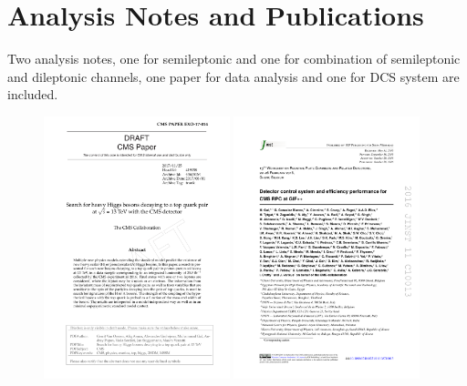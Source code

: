\graphicspath{{chapt_dutch/}{intro/}{chapt2/}{chapt3/}{chapt4/}{chapt5/}{chapt6/}{chapt7/}{publications}}
\renewcommand{\thesection}{\arabic{section}} 
\renewcommand{\bibname}{References}
\renewcommand\evenpagerightmark{{\scshape\small Analysis Notes and Publications}}
\renewcommand\oddpageleftmark{{\scshape\small Analysis Notes and Publications}}
\chapter[Analysis Notes and Publications]%
{Analysis Notes and Publications}\label{an_publications}
Two analysis notes, one for semileptonic and one for combination of semileptonic and dileptonic channels, one paper for data analysis and one for DCS system are included.
\hyphenation{}
\begin{figure}[!Hhtb]
\centering
\includegraphics[width=0.48\textwidth,keepaspectratio=true]{fig/front/paper.pdf}
\includegraphics[width=0.48\textwidth,keepaspectratio=true]{fig/front/pvss.pdf}

\end{figure}
